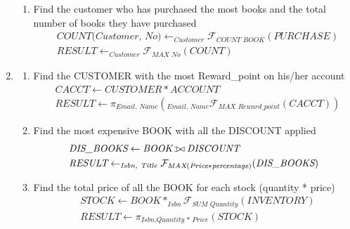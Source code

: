 \documentclass[12pt, letterpaper]{report}
\def\ojoin{\setbox0=\hbox{$\bowtie$}%
  \rule[-.02ex]{.25em}{.4pt}\llap{\rule[\ht0]{.25em}{.4pt}}}
\def\leftouterjoin{\mathbin{\ojoin\mkern-5.8mu\bowtie}}
\begin{document}
\begin{enumerate}
\begin{enumerate}
  \item Find the customer who has purchased the most books and the total number of books they have purchased
    \begin{align*}
      &\textit{COUNT(Customer, No)} \leftarrow _{\textit{Customer}}\mathcal{F}_{\textit{COUNT BOOK}}(\textit{PURCHASE})\\
      &\textit{RESULT} \leftarrow _{\textit{Customer}}\mathcal{F}_{\textit{MAX No}}(\textit{COUNT})
    \end{align*}

  \end{enumerate}

  \item
    \begin{enumerate}

    \item Find the CUSTOMER with the most Reward\_point on his/her account
    \begin{align*}
      &\textit{CACCT} \leftarrow \textit{CUSTOMER} * \textit{ACCOUNT}\\
      &\textit{RESULT} \leftarrow \pi_{\textit{Email, Name}}(_{\textit{Email, Name}}\mathcal{F}_{\textit{MAX Reward\_point}}(\textit{CACCT}))
    \end{align*}

  \item Find the most expensive BOOK with all the DISCOUNT applied
    \begin{align*}
      &\textit{DIS\_BOOKS} \leftarrow \textit{BOOK} \leftouterjoin \textit{DISCOUNT}\\
      &\textit{RESULT} \leftarrow _{\textit{Isbn, Title}}\mathcal{F}_{\textit{MAX} (\textit{Price} * \textit{percentage})}(\textit{DIS\_BOOKS})
    \end{align*}

  \item Find the total price of all the BOOK for each stock (quantity * price)
    \begin{align*}
      &\textit{STOCK} \leftarrow \textit{BOOK} * _{\textit{Isbn}}\mathcal{F}_{\textit{SUM Quantity}}(\textit{INVENTORY})\\
      &\textit{RESULT} \leftarrow \pi_{\textit{Isbn}, \textit{Quantity * Price}}(\textit{STOCK})
    \end{align*}

    \end{enumerate}

\end{enumerate}
\end{document}

